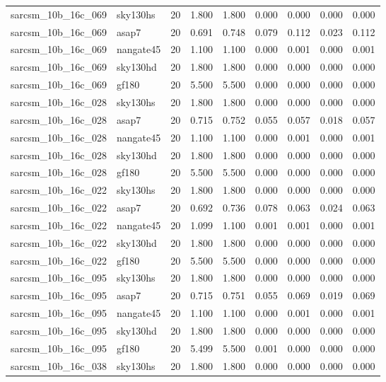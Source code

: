 \begin{tabular}{llrrrrrrr}
sarcsm\_10b\_16c\_069 & sky130hs & 20 & 1.800 & 1.800 & 0.000 & 0.000 & 0.000 & 0.000 \\
sarcsm\_10b\_16c\_069 & asap7 & 20 & 0.691 & 0.748 & 0.079 & 0.112 & 0.023 & 0.112 \\
sarcsm\_10b\_16c\_069 & nangate45 & 20 & 1.100 & 1.100 & 0.000 & 0.001 & 0.000 & 0.001 \\
sarcsm\_10b\_16c\_069 & sky130hd & 20 & 1.800 & 1.800 & 0.000 & 0.000 & 0.000 & 0.000 \\
sarcsm\_10b\_16c\_069 & gf180 & 20 & 5.500 & 5.500 & 0.000 & 0.000 & 0.000 & 0.000 \\
sarcsm\_10b\_16c\_028 & sky130hs & 20 & 1.800 & 1.800 & 0.000 & 0.000 & 0.000 & 0.000 \\
sarcsm\_10b\_16c\_028 & asap7 & 20 & 0.715 & 0.752 & 0.055 & 0.057 & 0.018 & 0.057 \\
sarcsm\_10b\_16c\_028 & nangate45 & 20 & 1.100 & 1.100 & 0.000 & 0.001 & 0.000 & 0.001 \\
sarcsm\_10b\_16c\_028 & sky130hd & 20 & 1.800 & 1.800 & 0.000 & 0.000 & 0.000 & 0.000 \\
sarcsm\_10b\_16c\_028 & gf180 & 20 & 5.500 & 5.500 & 0.000 & 0.000 & 0.000 & 0.000 \\
sarcsm\_10b\_16c\_022 & sky130hs & 20 & 1.800 & 1.800 & 0.000 & 0.000 & 0.000 & 0.000 \\
sarcsm\_10b\_16c\_022 & asap7 & 20 & 0.692 & 0.736 & 0.078 & 0.063 & 0.024 & 0.063 \\
sarcsm\_10b\_16c\_022 & nangate45 & 20 & 1.099 & 1.100 & 0.001 & 0.001 & 0.000 & 0.001 \\
sarcsm\_10b\_16c\_022 & sky130hd & 20 & 1.800 & 1.800 & 0.000 & 0.000 & 0.000 & 0.000 \\
sarcsm\_10b\_16c\_022 & gf180 & 20 & 5.500 & 5.500 & 0.000 & 0.000 & 0.000 & 0.000 \\
sarcsm\_10b\_16c\_095 & sky130hs & 20 & 1.800 & 1.800 & 0.000 & 0.000 & 0.000 & 0.000 \\
sarcsm\_10b\_16c\_095 & asap7 & 20 & 0.715 & 0.751 & 0.055 & 0.069 & 0.019 & 0.069 \\
sarcsm\_10b\_16c\_095 & nangate45 & 20 & 1.100 & 1.100 & 0.000 & 0.001 & 0.000 & 0.001 \\
sarcsm\_10b\_16c\_095 & sky130hd & 20 & 1.800 & 1.800 & 0.000 & 0.000 & 0.000 & 0.000 \\
sarcsm\_10b\_16c\_095 & gf180 & 20 & 5.499 & 5.500 & 0.001 & 0.000 & 0.000 & 0.000 \\
sarcsm\_10b\_16c\_038 & sky130hs & 20 & 1.800 & 1.800 & 0.000 & 0.000 & 0.000 & 0.000 \\

\end{tabular}
